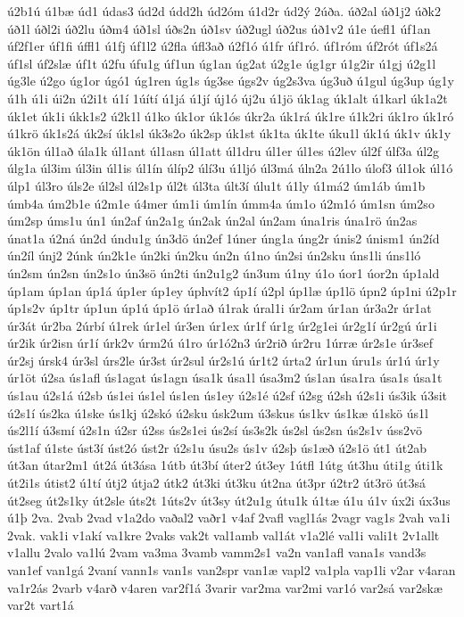 {ú2b1ú
ú1bæ
úd1
údas3
úd2d
údd2h
úd2óm
ú1d2r
úd2ý
2úða.
úð2al
úð1j2
úðk2
úð1l
úðl2i
úð2lu
úðm4
úð1sl
úðs2n
úð1sv
úð2ugl
úð2us
úð1v2
ú1e
úefl1
úf1an
úf2f1er
úf1fi
úffl1
ú1fj
úf1l2
ú2fla
úfl3að
ú2f1ó
ú1fr
úf1ró.
úf1róm
úf2rót
úf1s2á
úf1sl
úf2slæ
úf1t
ú2fu
úfu1g
úf1un
úg1an
úg2at
ú2g1e
úg1gr
ú1g2ir
ú1gj
ú2g1l
úg3le
ú2go
úg1or
úgó1
úg1ren
úg1s
úg3se
úgs2v
úg2s3va
úg3uð
ú1gul
úg3up
úg1y
ú1h
ú1i
úi2n
ú2i1t
ú1í
1úítí
ú1já
ú1jí
új1ó
új2u
ú1jö
úk1ag
úk1alt
ú1karl
úk1a2t
úk1et
úk1i
úkk1s2
ú2k1l
ú1ko
úk1or
úk1ós
úkr2a
úk1rá
úk1re
ú1k2ri
úk1ro
úk1ró
ú1krö
úk1s2á
úk2sí
úk1sl
úk3s2o
úk2sp
úk1st
úk1ta
úk1te
úku1l
úk1ú
úk1v
úk1y
úk1ön
úl1að
úla1k
úl1ant
úl1asn
úl1att
úl1dru
úl1er
úl1es
ú2lev
úl2f
úlf3a
úl2g
úlg1a
úl3im
úl3in
úl1is
úl1ín
úlíp2
úlí3u
ú1ljó
úl3má
úln2a
2ú1lo
úlof3
úl1ok
úl1ó
úlp1
úl3ro
úls2e
úl2sl
úl2s1p
úl2t
úl3ta
últ3í
úlu1t
ú1ly
ú1má2
úm1áb
úm1b
úmb4a
úm2b1e
ú2m1e
ú4mer
úm1i
úm1ín
úmm4a
úm1o
ú2m1ó
úm1sn
úm2so
úm2sp
úms1u
ún1
ún2af
ún2a1g
ún2ak
ún2al
ún2am
úna1ris
úna1rö
ún2as
únat1a
ú2ná
ún2d
úndu1g
ún3dö
ún2ef
1úner
úng1a
úng2r
únis2
únism1
ún2íd
ún2íl
únj2
2únk
ún2k1e
ún2ki
ún2ku
ún2n
ú1no
ún2si
ún2sku
úns1li
úns1ló
ún2sm
ún2sn
ún2s1o
ún3sö
ún2ti
ún2u1g2
ún3um
ú1ny
ú1o
úor1
úor2n
úp1ald
úp1am
úp1an
úp1á
úp1er
úp1ey
úphvít2
úp1í
ú2pl
úp1læ
úp1lö
úpn2
úp1ni
ú2p1r
úp1s2v
úp1tr
úp1un
úp1ú
úp1ö
úr1að
ú1rak
úral1i
úr2am
úr1an
úr3a2r
úr1at
úr3át
úr2ba
2úrbí
ú1rek
úr1el
úr3en
úr1ex
úr1f
úr1g
úr2g1ei
úr2g1í
úr2gú
úr1i
úr2ik
úr2isn
úr1í
úrk2v
úrm2ú
ú1ro
úr1ó2n3
úr2rið
úr2ru
1úrræ
úr2s1e
úr3sef
úr2sj
úrsk4
úr3sl
úrs2le
úr3st
úr2sul
úr2s1ú
úr1t2
úrta2
úr1un
úru1s
úr1ú
úr1y
úr1öt
ú2sa
ús1afl
ús1agat
ús1agn
úsa1k
úsa1l
úsa3m2
ús1an
úsa1ra
úsa1s
úsa1t
ús1au
ú2s1á
ú2sb
ús1ei
ús1el
ús1en
ús1ey
ú2s1é
ú2sf
ú2sg
ú2sh
ú2s1i
ús3ik
ú3sit
ú2s1í
ús2ka
ú1ske
ús1kj
ú2skó
ú2sku
úsk2um
ú3skus
ús1kv
ús1kæ
ú1skö
ús1l
ús2l1í
ú3smí
ú2s1n
ú2sr
ú2ss
ús2s1ei
ús2sí
ús3s2k
ús2sl
ús2sn
ús2s1v
úss2vö
úst1af
ú1ste
úst3í
úst2ó
úst2r
ú2s1u
úsu2s
ús1v
ú2sþ
ús1æð
ú2s1ö
út1
út2ab
út3an
útar2m1
út2á
út3ása
1útb
út3bí
úter2
út3ey
1útfl
1útg
út3hu
úti1g
úti1k
út2i1s
útist2
ú1tí
útj2
útja2
útk2
út3ki
út3ku
út2na
út3pr
ú2tr2
út3rö
út3sá
út2seg
út2s1ky
út2sle
úts2t
1úts2v
út3sy
út2u1g
útu1k
ú1tæ
ú1u
ú1v
úx2i
úx3us
ú1þ
2va.
2vab
2vad
v1a2do
vaðal2
vaðr1
v4af
2vafl
vagl1ás
2vagr
vag1s
2vah
va1i
2vak.
vak1i
v1akí
va1kre
2vaks
vak2t
val1amb
val1át
v1a2lé
val1i
vali1t
2v1allt
v1allu
2valo
va1lú
2vam
va3ma
3vamb
vamm2s1
va2n
van1afl
vana1s
vand3s
van1ef
van1gá
2vaní
vann1s
van1s
van2spr
van1æ
vapl2
va1pla
vap1li
v2ar
v4aran
va1r2ás
2varb
v4arð
v4aren
var2f1á
3varir
var2ma
var2mi
var1ó
var2sá
var2skæ
var2t
vart1á
}
